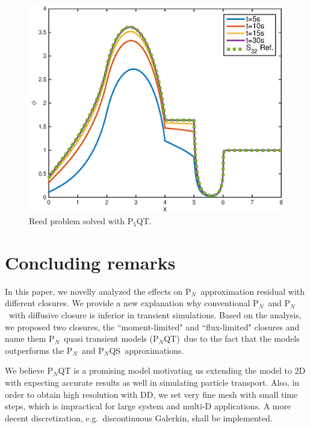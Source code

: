 \documentclass[review]{elsarticle}
\newcommand{\pn}{P$_N$}
\newcommand{\pnqt}{P$_N$QT}
\newcommand{\pnqs}{P$_N$QS}
\begin{document}
\begin{figure}[ht!]
	\begin{center}
		\includegraphics[width=1.\textwidth]{reed_p5qt.eps}
		\caption[]{\label{reed}Reed problem solved with P$_5$QT.}%
	\end{center}
\end{figure}

\section{Concluding remarks}
In this paper, we novelly analyzed the effects on \pn~approximation residual with different closures. We provide a new explanation why conventional \pn~and \pn~with diffusive closure is inferior in transient simulations. Based on the analysis, we proposed two closures, the ``moment-limited" and ``flux-limited" closures and name them P$_N$~quasi transient models (\pnqt)~due to the fact that the models outperforms the \pn~and \pnqs~approximations.

We believe P$_N$QT is a promising model motivating us extending the model to 2D with expecting accurate results as well in simulating particle transport. Also, in order to obtain high resolution with DD, we set very fine mesh with small time steps, which is impractical for large system and multi-D applications. A more decent discretization, e.g.~discontinuous Galerkin, shall be implemented.
\end{document}
